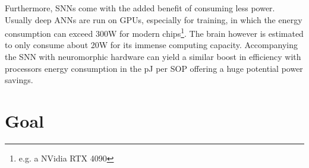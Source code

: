 Furthermore, \acp{SNN} come with the added benefit of consuming less power. Usually deep \acp{ANN} are run on \acp{GPU}, especially for training, in which the energy consumption can exceed 300W for modern chips\footnote{e.g. a NVidia RTX 4090}. The brain however is estimated to only consume about
20W \cite{clarke_circulation_1999} for its immense computing capacity. Accompanying the \ac{SNN} with neuromorphic hardware can yield a similar boost in efficiency with processors energy consumption in the pJ per \ac{SOP}\cite{indiveri_importance_2019} offering a huge potential power savings.



\section{Goal}

